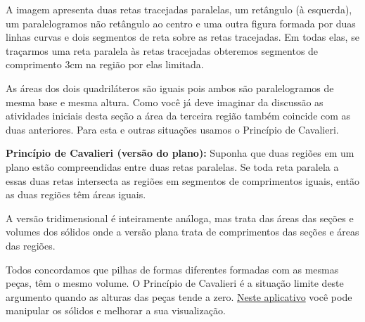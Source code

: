 \label{\detokenize{GE504-9:organizando-as-ideias-principio-de-cavalieri}}\label{\detokenize{GE504-9::doc}}
A imagem apresenta duas retas tracejadas paralelas, um retângulo (à esquerda), um paralelogramos não retângulo ao centro e uma outra figura formada por duas linhas curvas e dois segmentos de reta sobre as retas tracejadas. Em todas elas, se traçarmos uma reta paralela às retas tracejadas obteremos segmentos de comprimento 3cm na região por elas limitada.

\begin{figure}[H]
\centering

\end{figure}

As áreas dos dois quadriláteros são iguais pois ambos são paralelogramos de mesma base e mesma altura. Como você já deve imaginar da discussão as atividades iniciais desta seção a área da terceira região também coincide com as duas anteriores. Para esta e outras situações usamos o Princípio de Cavalieri.

\textbf{Princípio de Cavalieri (versão do plano):} Suponha que duas regiões em um plano estão compreendidas entre duas retas paralelas. Se toda reta paralela a essas duas retas intersecta as regiões em segmentos de comprimentos iguais, então as duas regiões têm áreas iguais.

A versão tridimensional é inteiramente análoga, mas trata das áreas das seções e volumes dos sólidos onde a versão plana trata de comprimentos das seções e áreas das regiões.

Todos concordamos que pilhas de formas diferentes formadas com as mesmas peças, têm o mesmo volume. O Princípio de Cavalieri é a situação limite deste argumento quando as alturas das peças tende a zero. \href{https://ggbm.at/kdzfw7xd}{Neste aplicativo} você pode manipular os sólidos e melhorar a sua visualização.

